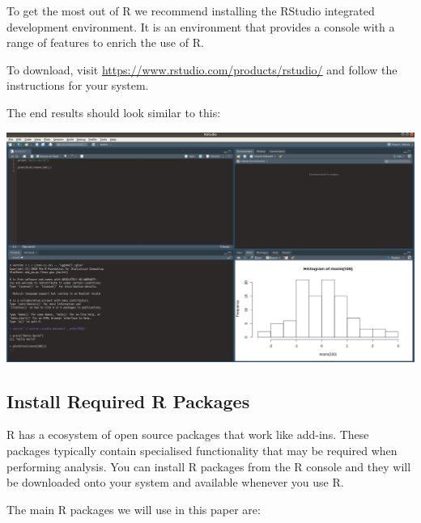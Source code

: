 \documentclass[]{book}
\begin{document}
To get the most out of R we recommend installing the RStudio
\citep{noauthor_rstudio_2019} integrated development environment. It is
an environment that provides a console with a range of features to
enrich the use of R.

To download, visit \url{https://www.rstudio.com/products/rstudio/} and
follow the instructions for your system.

The end results should look similar to this:

\includegraphics[width=6.01in]{img/rstudio}

\subsection{Install Required R
Packages}\label{install-required-r-packages}

R has a ecosystem of open source packages that work like add-ins. These
packages typically contain specialised functionality that may be
required when performing analysis. You can install R packages from the R
console and they will be downloaded onto your system and available
whenever you use R.

The main R packages we will use in this paper are:
\end{document}
